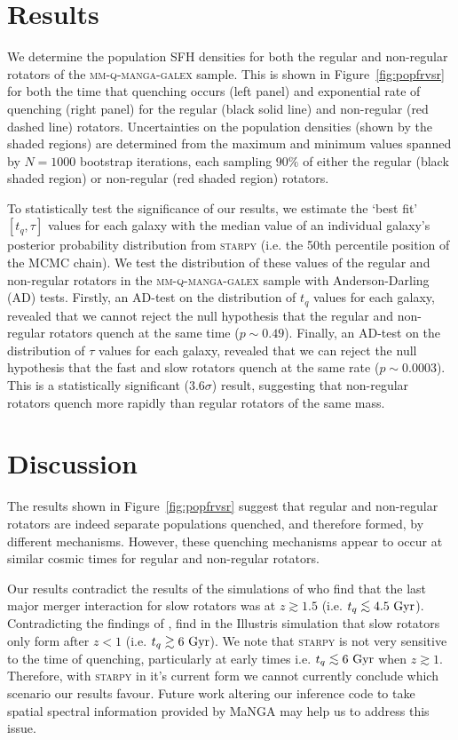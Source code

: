 \documentclass[useAMS,usenatbib]{mn2e}
\def\lesssim{\mathrel{\hbox{\rlap{\hbox{\lower3pt\hbox{$\sim$}}}\hbox{\raise2pt\hbox{$<$}}}}}
\begin{document}
\section{Results}\label{sec:results}

We determine the population SFH densities for both the regular and non-regular rotators of the \textsc{mm-q-manga-galex} sample. This is shown in Figure~\ref{fig:popfrvsr} for both the time that quenching occurs (left panel) and exponential rate of quenching (right panel) for the regular (black solid line) and non-regular (red dashed line) rotators. Uncertainties on the population densities (shown by the shaded regions) are determined from the maximum and minimum values spanned by $N = 1000$ bootstrap iterations, each sampling $90\%$ of either the regular (black shaded region) or non-regular (red shaded region) rotators. 

To statistically test the significance of our results, we estimate the `best fit' $[t_q, \tau]$ values for each galaxy with the median value of an individual galaxy's posterior probability distribution from \textsc{starpy} (i.e. the 50th percentile position of the MCMC chain). We test the distribution of these values of the regular and non-regular rotators in the \textsc{mm-q-manga-galex} sample with Anderson-Darling (AD) tests. Firstly, an AD-test on the distribution of $t_q$ values for each galaxy, revealed that we cannot reject the null hypothesis that the regular and non-regular rotators quench at the same time ($p \sim 0.49$). Finally, an AD-test on the distribution of $\tau$ values for each galaxy, revealed that we can reject the null hypothesis that the fast and slow rotators quench at the same rate ($p \sim 0.0003$). This is a statistically significant ($3.6\sigma$) result, suggesting that non-regular rotators quench more rapidly than regular rotators of the same mass.


\section{Discussion}\label{sec:discussion}

The results shown in Figure~\ref{fig:popfrvsr} suggest that regular and non-regular rotators are indeed separate populations quenched, and therefore formed, by different mechanisms. However, these quenching mechanisms appear to occur at similar cosmic times for regular and non-regular rotators.

Our results contradict the results of the simulations of \cite{khochfar11} who find that the last major merger interaction for slow rotators was at $z \gtrsim 1.5$ (i.e. $t_q \lesssim 4.5~\rm{Gyr}$). Contradicting the findings of \citeauthor{khochfar11}, \cite{penoyre17} find in the Illustris simulation that slow rotators only form after $z < 1$ (i.e. $t_q \gtrsim 6~\rm{Gyr}$). We note that \textsc{starpy} is not very sensitive to the time of quenching, particularly at early times i.e. $t_q \lesssim 6~\rm{Gyr}$ when $z \gtrsim 1$. Therefore, with \textsc{starpy} in it's current form we cannot currently conclude which scenario our results favour. Future work altering our inference code to take spatial spectral information provided by MaNGA may help us to address this issue.
\end{document}
